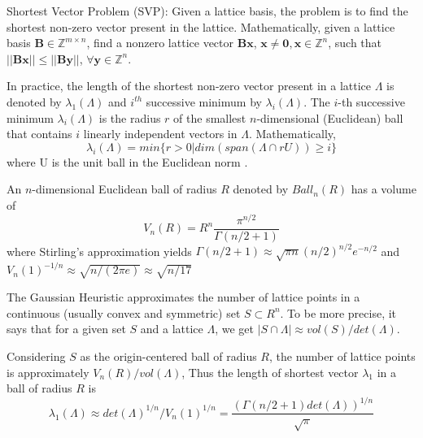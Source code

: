 \begin{definition}
    Shortest Vector Problem (SVP): Given a lattice basis, the problem is to find the shortest non-zero vector present in the lattice.
    Mathematically, given a lattice basis $\pmb{B}\in \mathbb{Z}^{m \times n}$, find a nonzero lattice vector $\pmb{Bx}$, $\pmb{x}\neq \pmb{0}, \pmb{x} \in \mathbb{Z}^n$, such that $||\pmb{Bx}|| \leq ||\pmb{By}||$, $\forall \pmb{y} \in \mathbb{Z}^n$.%
\end{definition}
In practice, the length of the shortest non-zero vector present in a lattice $\Lambda$ is denoted by $\lambda_1(\Lambda)$ and $i^{th}$ successive minimum by $\lambda_i(\Lambda)$.
The $i$-th successive minimum $\lambda_i(\Lambda)$ is the radius $r$ of the smallest $n$-dimensional (Euclidean) ball that contains $i$ linearly independent vectors in $\Lambda$.
Mathematically,
\begin{equation*}
    \lambda_i(\Lambda) = min\{r > 0 | dim(span(\Lambda \cap rU)) \geq i\}
\end{equation*}
where U is the unit ball in the Euclidean norm \cite{laarhoven2012solving}.

An $n$-dimensional Euclidean ball of radius $R$ denoted by $Ball_n(R)$ has a volume of
\begin{equation*}
    V_n(R) = R^n \frac{\pi^{n/2}}{\Gamma(n/2+1)}
\end{equation*}
where Stirling's approximation yields $\Gamma(n/2+1) \approx \sqrt{\pi n}(n/2)^{n/2}e^{-n/2}$ and $V_n(1)^{-1/n} \approx \sqrt{n/(2\pi e)} \approx \sqrt{n/17}$

The Gaussian Heuristic approximates the number of lattice points in a continuous (usually convex and symmetric) set $S\subset R^n$.
To be more precise, it says that for a given set $S$ and a lattice $\Lambda$, we get $|S\cap \Lambda| \approx vol(S)/det(\Lambda)$.

Considering $S$ as the origin-centered ball of radius $R$, the number of lattice points is approximately $V_n(R)/vol(\Lambda)$, Thus the length of shortest vector $\lambda_1$ in a ball of radius $R$ is
\begin{equation*}
    \lambda_1(\Lambda) \approx det(\Lambda)^{1/n}/ V_n(1)^{1/n}= \frac{(\Gamma(n/2+1)det(\Lambda))^{1/n}}{\sqrt{\pi}}
\end{equation*}

